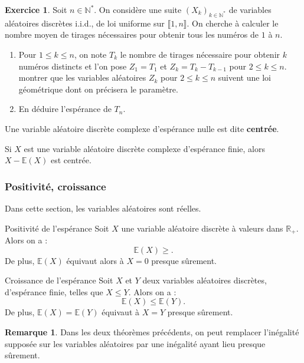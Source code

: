 \documentclass[french]{article}
\newcommand{\N}{\mathbb{N}}
\newcommand{\R}{\mathbb{R}}
\newcommand{\st}{^*}
\newcommand{\E}{\mathbb{E}}
\theoremstyle{plain}
\theoremstyle{definition}
\newtheorem{exo}{Exercice}
\newtheorem*{rmq}{Remarque}
\theoremstyle{remark}
\begin{document}
\begin{exo}
	Soit $n\in\N\st$. On considère une suite $(X_k)_{k\in\N\st}$ de variables aléatoires discrètes i.i.d., de loi uniforme sur $\llbracket1,n\rrbracket$. On cherche à calculer le nombre moyen de tirages nécessaires pour obtenir tous les numéros de $1$ à $n$.
	\begin{enumerate}
		\item Pour $1\leqslant k\leqslant n$, on note $T_k$ le nombre de tirages nécessaire pour obtenir $k$ numéros distincts et l'on pose $Z_1=T_1$ et $Z_k=T_k-T_{k-1}$ pour $2\leqslant k\leqslant n$. \\
		montrer que les variables aléatoires $Z_k$ pour $2\leqslant k\leqslant n$ suivent une loi géométrique dont on précisera le paramètre.
		\item En déduire l'espérance de $T_n$.
	\end{enumerate}
\end{exo}

\begin{dfn}
	Une variable aléatoire discrète complexe d'espérance nulle est dite \textbf{centrée}.
\end{dfn}

\begin{thm}{}%
	Si $X$ est une variable aléatoire discrète complexe d'espérance finie, alors $X-\E(X)$ est centrée.
\end{thm}

\subsubsection*{Positivité, croissance}

Dans cette section, les variables aléatoires sont réelles.

\begin{thm}{Positivité de l'espérance}%
	Soit $X$ une variable aléatoire discrète à valeurs dans $\R_+$. Alors on a : $$\E(X)\geqslant.$$
	De plus, $\E(X)$ équivaut alors à $X=0$ presque sûrement.
\end{thm}

\begin{thm}{Croissance de l'espérance}%
	Soit $X$ et $Y$ deux variables aléatoires discrètes, d'espérance finie, telles que $X\leqslant Y$. Alors on a :
	$$\E(X)\leqslant\E(Y).$$
	De plus, $\E(X)=\E(Y)$ équivaut à $X=Y$ presque sûrement.
\end{thm}

\begin{rmq}
	Dans les deux théorèmes précédents, on peut remplacer l'inégalité supposée sur les variables aléatoires par une inégalité ayant lieu presque sûrement.
\end{rmq}
\end{document}
